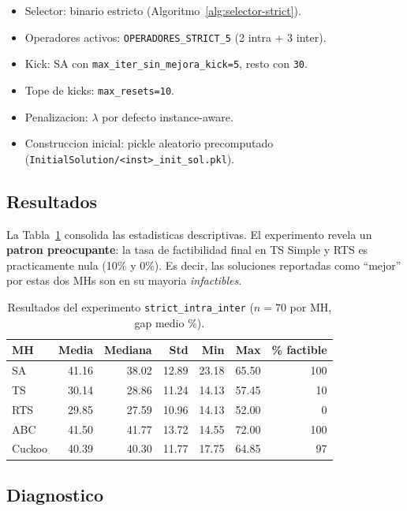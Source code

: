 \begin{itemize}
\item Selector: binario estricto (Algoritmo~\ref{alg:selector-strict}).
\item Operadores activos: \texttt{OPERADORES\_STRICT\_5}
  (2 intra + 3 inter).
\item Kick: SA con \texttt{max\_iter\_sin\_mejora\_kick=5},
  resto con \texttt{30}.
\item Tope de kicks: \texttt{max\_resets=10}.
\item Penalizacion: $\lambda$ por defecto instance-aware.
\item Construccion inicial: pickle aleatorio precomputado
  (\texttt{InitialSolution/<inst>\_init\_sol.pkl}).
\end{itemize}

\subsection{Resultados}

La Tabla~\ref{tab:strict-resultados} consolida las estadisticas
descriptivas. El experimento revela un \textbf{patron preocupante}: la
tasa de factibilidad final en TS Simple y RTS es practicamente nula
(10\% y 0\%). Es decir, las soluciones reportadas como ``mejor'' por
estas dos MHs son en su mayoria \emph{infactibles}.

\begin{table}[h]
\centering
\caption{Resultados del experimento \texttt{strict\_intra\_inter}
($n = 70$ por MH, gap medio \%).}
\label{tab:strict-resultados}
\small
\begin{tabular}{lrrrrrr}
\toprule
MH & Media & Mediana & Std & Min & Max & \% factible \\
\midrule
SA      & 41.16 & 38.02 & 12.89 & 23.18 & 65.50 & 100 \\
TS      & 30.14 & 28.86 & 11.24 & 14.13 & 57.45 &  10 \\
RTS     & 29.85 & 27.59 & 10.96 & 14.13 & 52.00 &   0 \\
ABC     & 41.50 & 41.77 & 13.72 & 14.55 & 72.00 & 100 \\
Cuckoo  & 40.39 & 40.30 & 11.77 & 17.75 & 64.85 &  97 \\
\bottomrule
\end{tabular}
\end{table}

\subsection{Diagnostico}

